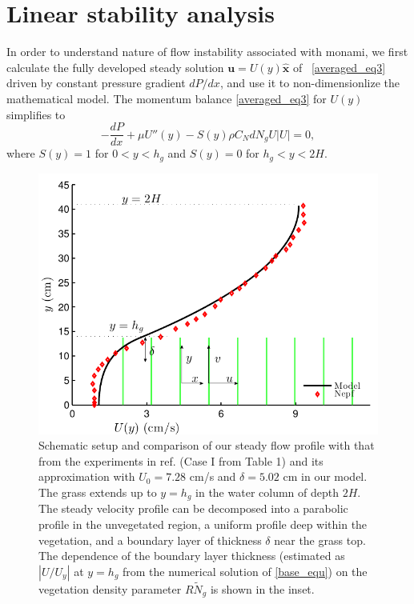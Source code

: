 \documentclass[12pt]{report}   %
\newcommand{\bu}{\mathbf{u}}
\newcommand{\hg}{h_g}
\newcommand{\Rey}{{R}}
\newcommand{\Ndg}{\tilde{N}_g}
\newcommand{\ReyNdg}{{\Rey\Ndg}}
\begin{document}
\chapter{Linear stability analysis}
In order to understand nature of flow instability associated with monami, we first calculate the fully developed steady solution $\bu = U(y)\boldsymbol{\hat{x}}$ of ~\eqref{averaged_eq3} driven by constant pressure gradient $dP/dx$, and use it to non-dimensionlize the mathematical model. The momentum balance \eqref{averaged_eq3} for $U(y)$ simplifies to
\begin{equation}
 -\frac{dP}{dx}+\mu U''(y) -S(y) \rho C_N d N_gU |U|=0,
\label{base_equ}
\end{equation}
where $S(y)=1$ for $0<y<\hg$ and $S(y)=0$ for $\hg< y< 2H$.
\begin{figure}
\centerline{\includegraphics[scale=.99]{Grass_Base_Nepf} }
\caption{
Schematic setup and comparison of our steady flow profile with that from the experiments in ref. \cite{Nepf04} (Case I from Table 1) %
 and its approximation with $U_0=7.28$ cm/s and $\delta = 5.02$ cm in our model. The grass extends up to $y=\hg$ in the water column of depth $2H$. 
The steady velocity profile can be decomposed into a parabolic profile in the unvegetated region, a uniform profile deep within the vegetation, and a boundary layer of thickness $\delta$ near the grass top. 
The dependence of the boundary layer thickness (estimated as $|U/U_y|$ at $y=\hg$ from the numerical solution of \eqref{base_equ}) on the vegetation density parameter $\ReyNdg$ is shown in the inset.
}
\label{basicflow}
\end{figure}
\end{document}
